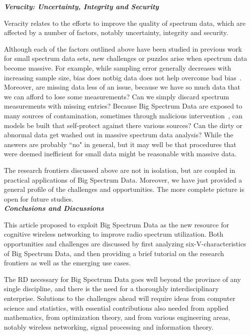 \documentclass[12pt,draftcls,journal,letterpaper,oneside,onecolumn]{IEEEtran}
\begin{document}
\textbf{\emph{Veracity: Uncertainty, Integrity and Security}}

Veracity relates to the efforts to improve the quality of spectrum data, which are affected by a number of factors, notably uncertainty, integrity and security.

Although each of the factors outlined above have been studied in previous work for small spectrum data sets, new challenges or puzzles arise when spectrum data become massive. For example, while sampling error generally decreases with increasing sample size, bias does notbig data does not help overcome bad bias~\cite{Frontiers}. Moreover, are missing data less of an issue, because we have so much data that we can afford to lose some measurements? Can we simply discard spectrum measurements with missing entries? Because Big Spectrum Data are exposed to many sources of contamination, sometimes through malicious intervention~\cite{ShuiYu}, can models be built that self-protect against there various sources? Can the dirty or abnormal data get washed out in massive spectrum data analysis? While the answers are probably ``no" in general, but it may well be that procedures that were deemed inefficient for small data might be reasonable with massive data.








The research frontiers discussed above are not in isolation, but are coupled in practical applications of Big Spectrum Data. Moreover, we have just provided a general profile of the challenges and opportunities. The more complete picture is open for future studies.
\\

\textbf{\emph{Conclusions and Discussions}}

This article proposed to exploit Big Spectrum Data as the new resource for cognitive wireless networking to improve radio spectrum utilization. Both opportunities and challenges are discussed by first analyzing six-V-characteristics of Big Spectrum Data, and then providing a brief tutorial on the research frontiers as well as the emerging use cases.

The RD necessary for Big Spectrum Data goes well beyond the province of any single discipline, and there is the need for a thoroughly interdisciplinary enterprise. Solutions to the challenges ahead will require ideas from computer science and statistics, with essential contributions also needed from applied mathematics, from optimization theory, and from various engineering areas, notably wireless networking, signal processing and information theory.
\\
\end{document}

